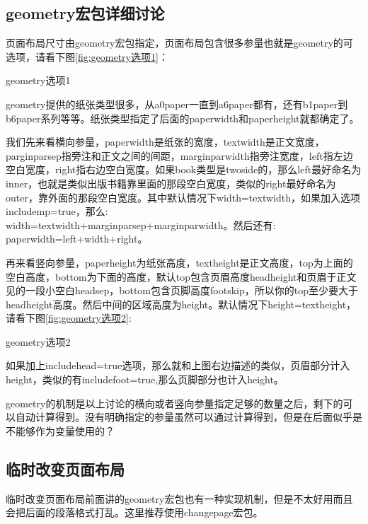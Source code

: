\subsection{geometry宏包详细讨论}
页面布局尺寸由geometry宏包指定，页面布局包含很多参量也就是geometry的可选项，请看下图\ref{fig:geometry选项1}：

\begin{fig}{geometry选项1}   %
	\label{fig:geometry选项1}
\end{fig}

geometry提供的纸张类型很多，从a0paper一直到a6paper都有，还有b1paper到b6paper系列等等。纸张类型指定了后面的paperwidth和paperheight就都确定了。

我们先来看横向参量，paperwidth是纸张的宽度，textwidth是正文宽度，parginparsep指旁注和正文之间的间距，marginparwidth指旁注宽度，left指左边空白宽度，right指右边空白宽度。如果book类型是twoside的，那么left最好命名为inner，也就是类似出版书籍靠里面的那段空白宽度，类似的right最好命名为outer，靠外面的那段空白宽度。其中默认情况下width=textwidth，如果加入选项\\includemp=true，那么:\\width=textwidth+marginparsep+marginparwidth。然后还有:\\paperwidth=left+width+right。

再来看竖向参量，paperheight为纸张高度，textheight是正文高度，top为上面的空白高度，bottom为下面的高度，默认top包含页眉高度headheight和页眉于正文见的一段小空白headsep，bottom包含页脚高度footskip，所以你的top至少要大于headheight高度。然后中间的区域高度为height。默认情况下height=textheight，请看下图\ref{fig:geometry选项2}:

\begin{scalefig}[0.6]{geometry选项2}  
	\label{fig:geometry选项2}
\end{scalefig}

如果加上includehead=true选项，那么就和上图右边描述的类似，页眉部分计入height，类似的有includefoot=true,那么页脚部分也计入height。

geometry的机制是以上讨论的横向或者竖向参量指定足够的数量之后，剩下的可以自动计算得到。没有明确指定的参量虽然可以通过计算得到，但是在后面似乎是不能够作为变量使用的？


\subsection{临时改变页面布局}
临时改变页面布局前面讲的geometry宏包也有一种实现机制，但是不太好用而且会把后面的段落格式打乱。这里推荐使用changepage宏包。

